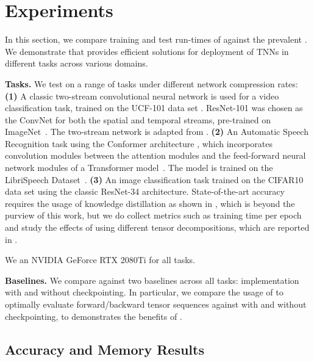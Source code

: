 \section{Experiments}
\label{sec:experiments}

In this section, we compare training and test run-times of \autotnn against the prevalent \pytorch. We demonstrate that \autotnn provides efficient solutions for deployment of TNNs in different tasks across various domains.

\textbf{Tasks.} 
We test \autotnn on a range of tasks under different network compression rates:
\textbf{(1)} A classic two-stream convolutional neural network \citep{simonyan2014two} is used for a video classification task, trained on the UCF-101 data set \citep{Soomro2012UCF101AD}. ResNet-101 \citep{he2016deep} was chosen as the ConvNet for both the spatial and temporal streams, pre-trained on ImageNet~\citep{deng2009imagenet}. The two-stream network is adapted from \citep{huang2019twostream}.
\textbf{(2)} An Automatic Speech Recognition task using the Conformer architecture \citep{gulati2020conformer}, which incorporates convolution modules between the attention modules and the feed-forward neural network modules of a Transformer model~\citep{vaswani2017attention}. The model is trained on the LibriSpeech Dataset~\citep{panayotov2015librispeech}.
\textbf{(3)} An image classification task trained on the CIFAR10~\citep{krizhevsky2009learning} data set using the classic ResNet-34 \citep{he2016deep} architecture. State-of-the-art accuracy requires the usage of knowledge distillation as shown in \citet{su2018tensorial}, which is beyond the purview of this work, but we do collect metrics such as training time per epoch and study the effects of using different tensor decompositions, which are reported in .

We an NVIDIA GeForce RTX 2080Ti for all tasks.

\textbf{Baselines.} 
We compare \autotnn against two baselines across all tasks: \pytorch implementation with and without checkpointing.
In particular, we compare the usage of \conveinsum to optimally evaluate forward/backward tensor sequences against \pytorch with and without checkpointing, to demonstrates the benefits of \conveinsum.



\subsection{Accuracy and Memory Results}
\label{sub:accuracy-memory}

